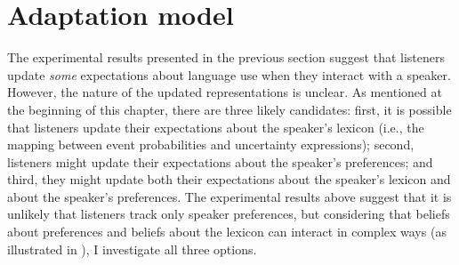 \section{Adaptation model}
\label{sec:model-adapt}



The experimental results presented in the previous section suggest that listeners update
\textit{some} expectations about language use when they interact with a speaker. 
However, the nature of the updated representations is unclear. As mentioned at the beginning of this chapter, there are three likely candidates:
first, it is possible that listeners update their expectations about the speaker's lexicon 
(i.e., the mapping between event probabilities and uncertainty expressions);  second, listeners
 might  update their expectations about the speaker's preferences; 
and third, they might update both their expectations about the speaker's lexicon 
and about the speaker's preferences. The experimental results above suggest that it is unlikely that listeners track only speaker preferences, but considering
that beliefs about preferences and beliefs about the lexicon can interact in complex ways (as illustrated in ), I investigate all three options.

